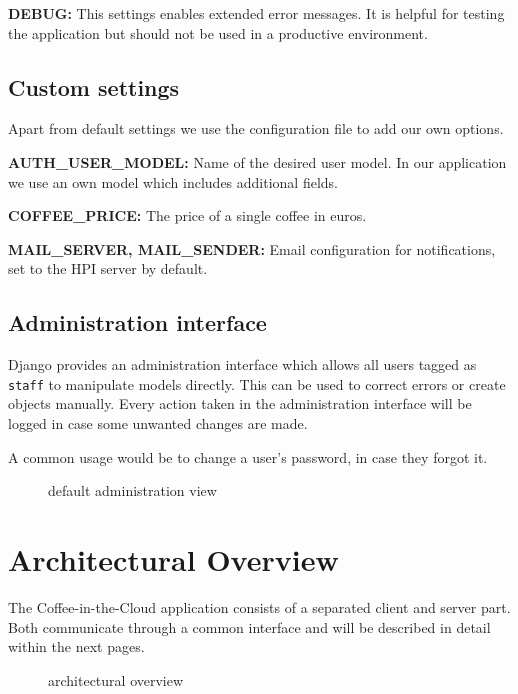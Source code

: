 \textbf{DEBUG:} This settings enables extended error messages. It is
helpful for testing the application but should not be used in a
productive environment.

\subsection{Custom settings}\label{custom-settings}

Apart from default settings we use the configuration file to add our own
options.

\textbf{AUTH\_USER\_MODEL:} Name of the desired user model. In our
application we use an own model which includes additional fields.

\textbf{COFFEE\_PRICE:} The price of a single coffee in euros.

\textbf{MAIL\_SERVER, MAIL\_SENDER:} Email configuration for
notifications, set to the HPI server by default.

\subsection{Administration interface}\label{administration-interface}

Django provides an administration interface which allows all users
tagged as \texttt{staff} to manipulate models directly. This can be used
to correct errors or create objects manually. Every action taken in the
administration interface will be logged in case some unwanted changes
are made.

A common usage would be to change a user's password, in case they forgot
it.

\begin{figure}[htbp]
\centering
{}
\caption{default administration view}
\end{figure}

\newpage
\section{Architectural Overview}\label{architectural-overview}

The Coffee-in-the-Cloud application consists of a separated client and
server part. Both communicate through a common interface and will be
described in detail within the next pages.

\begin{figure}[htbp]
\centering
{}
\caption{architectural overview}
\end{figure}

